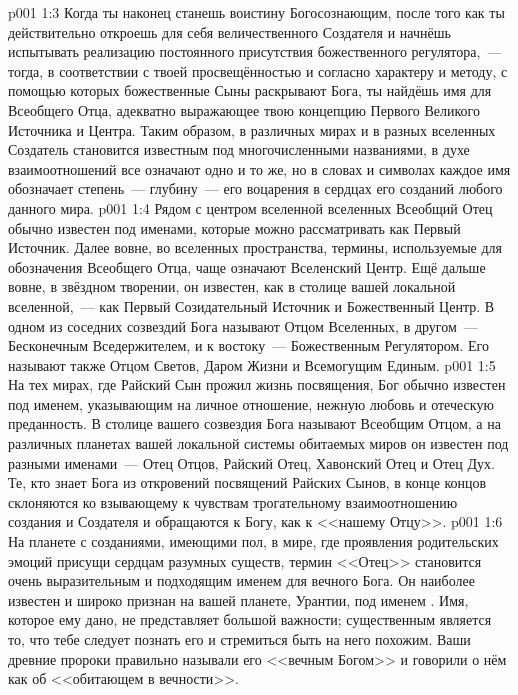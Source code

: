 \vs p001 1:3 Когда ты наконец станешь воистину Богосознающим, после того как ты действительно откроешь для себя величественного Создателя и начнёшь испытывать реализацию постоянного присутствия божественного регулятора,~--- тогда, в соответствии с твоей просвещённостью и согласно характеру и методу, с помощью которых божественные Сыны раскрывают Бога, ты найдёшь имя для Всеобщего Отца, адекватно выражающее твою концепцию Первого Великого Источника и Центра. Таким образом, в различных мирах и в разных вселенных Создатель становится известным под многочисленными названиями, в духе взаимоотношений все означают одно и то же, но в словах и символах каждое имя обозначает степень~--- глубину~--- его воцарения в сердцах его созданий любого данного мира.
\vs p001 1:4 \pc Рядом с центром вселенной вселенных Всеобщий Отец обычно известен под именами, которые можно рассматривать как Первый Источник. Далее вовне, во вселенных пространства, термины, используемые для обозначения Всеобщего Отца, чаще означают Вселенский Центр. Ещё дальше вовне, в звёздном творении, он известен, как в столице вашей локальной вселенной,~--- как Первый Созидательный Источник и Божественный Центр. В одном из соседних созвездий Бога называют Отцом Вселенных, в другом~--- Бесконечным Вседержителем, и к востоку~--- Божественным Регулятором. Его называют также Отцом Светов, Даром Жизни и Всемогущим Единым.
\vs p001 1:5 На тех мирах, где Райский Сын прожил жизнь посвящения, Бог обычно известен под именем, указывающим на личное отношение, нежную любовь и отеческую преданность. В столице вашего созвездия Бога называют Всеобщим Отцом, а на различных планетах вашей локальной системы обитаемых миров он известен под разными именами~--- Отец Отцов, Райский Отец, Хавонский Отец и Отец Дух. Те, кто знает Бога из откровений посвящений Райских Сынов, в конце концов склоняются ко взывающему к чувствам трогательному взаимоотношению создания и Создателя и обращаются к Богу, как к <<нашему Отцу>>.
\vs p001 1:6 На планете с созданиями, имеющими пол, в мире, где проявления родительских эмоций присущи сердцам разумных существ, термин <<Отец>> становится очень выразительным и подходящим именем для вечного Бога. Он наиболее известен и широко признан на вашей планете, Урантии, под именем . Имя, которое ему дано, не представляет большой важности; существенным является то, что тебе следует познать его и стремиться быть на него похожим. Ваши древние пророки правильно называли его <<вечным Богом>> и говорили о нём как об <<обитающем в вечности>>.
